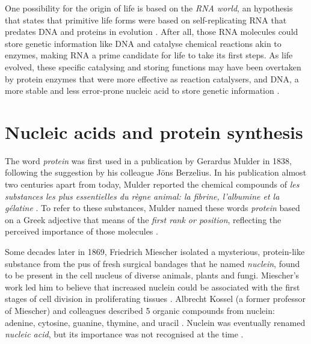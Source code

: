 One possibility for the origin of life is based on the \emph{RNA world}, an hypothesis that states that primitive life forms were based on self-replicating RNA that predates DNA and proteins in evolution \cite{gilbert:1986td,alberts:2008vj,sharp:1985th}. After all, those RNA molecules could store genetic information like DNA and catalyse chemical reactions akin to enzymes, making RNA a prime candidate for life to take its first steps. As life evolved, these specific catalysing and storing functions may have been overtaken by protein enzymes that were more effective as reaction catalysers, and DNA, a more stable and less error-prone nucleic acid to store genetic information \cite{gilbert:1986td,alberts:2008vj}.





\section{Nucleic acids and protein synthesis}

The word \emph{protein} was first used in a publication by Gerardus Mulder in 1838, following the suggestion by his colleague Jöns Berzelius. In his publication almost two centuries apart from today, Mulder reported the chemical compounds of \emph{les substances les plus essentielles du règne animal: la fibrine, l'albumine et la gélatine} \cite{mulder:1838uy}. %
To refer to these substances, Mulder named these words \emph{protein} based on a Greek adjective that means of the \emph{first rank or position}, reflecting the perceived importance of those molecules \cite{mulder:1838uy,vickery:1950ur}.


Some decades later in 1869, Friedrich Miescher isolated a mysterious, protein-like substance from the pus of fresh surgical bandages that he named \emph{nuclein}, found to be present in the cell nucleus of diverse animals, plants and fungi. Miescher's work led him to believe that increased nuclein could be associated with the first stages of cell division in proliferating tissues \cite{dahm:2005wx}. Albrecht Kossel (a former professor of Miescher) and colleagues described 5 organic compounds from nuclein: adenine, cytosine, guanine, thymine, and uracil \cite{kossel:1885tj,kossel:1893ws,kossel:1894vy,ascoli:1901ti}. Nuclein was eventually renamed \emph{nucleic acid}, but its importance was not recognised at the time \cite{dahm:2005wx}.

